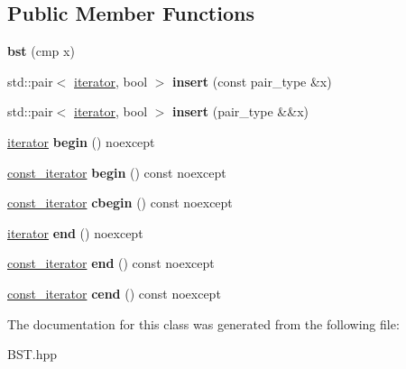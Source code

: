 \subsection*{Public Member Functions}
\begin{DoxyCompactItemize}
\item 
\mbox{\label{class_a_pbst_1_1bst_af21ac212fbd90c7aaa0d2e628224b858}} 
{\bfseries bst} (cmp x)
\item 
\mbox{\label{class_a_pbst_1_1bst_a2bf6ecaf0f0d76d7e385763d577d8943}} 
std\+::pair$<$ \hyperlink{class_a_putils_1_1____iterator}{iterator}, bool $>$ {\bfseries insert} (const pair\+\_\+type \&x)
\item 
\mbox{\label{class_a_pbst_1_1bst_abbfa2ad5a65285b4ea7c8f728ba20fab}} 
std\+::pair$<$ \hyperlink{class_a_putils_1_1____iterator}{iterator}, bool $>$ {\bfseries insert} (pair\+\_\+type \&\&x)
\item 
\mbox{\label{class_a_pbst_1_1bst_a0699512436b510c95f98412c72537083}} 
\hyperlink{class_a_putils_1_1____iterator}{iterator} {\bfseries begin} () noexcept
\item 
\mbox{\label{class_a_pbst_1_1bst_ab5594ef1cb7b6cc358b6913e7906be02}} 
\hyperlink{class_a_putils_1_1____iterator}{const\+\_\+iterator} {\bfseries begin} () const noexcept
\item 
\mbox{\label{class_a_pbst_1_1bst_a30f986ca27f9e82538867ec18ef6bac4}} 
\hyperlink{class_a_putils_1_1____iterator}{const\+\_\+iterator} {\bfseries cbegin} () const noexcept
\item 
\mbox{\label{class_a_pbst_1_1bst_af73a7b2cf0a76815660b24937636e778}} 
\hyperlink{class_a_putils_1_1____iterator}{iterator} {\bfseries end} () noexcept
\item 
\mbox{\label{class_a_pbst_1_1bst_a1e2a874d49ba819a96bba5d49a15e2bc}} 
\hyperlink{class_a_putils_1_1____iterator}{const\+\_\+iterator} {\bfseries end} () const noexcept
\item 
\mbox{\label{class_a_pbst_1_1bst_a8a505b3eb57b6e3606947c1ee438cd05}} 
\hyperlink{class_a_putils_1_1____iterator}{const\+\_\+iterator} {\bfseries cend} () const noexcept
\end{DoxyCompactItemize}


The documentation for this class was generated from the following file\+:\begin{DoxyCompactItemize}
\item 
B\+S\+T.\+hpp\end{DoxyCompactItemize}
